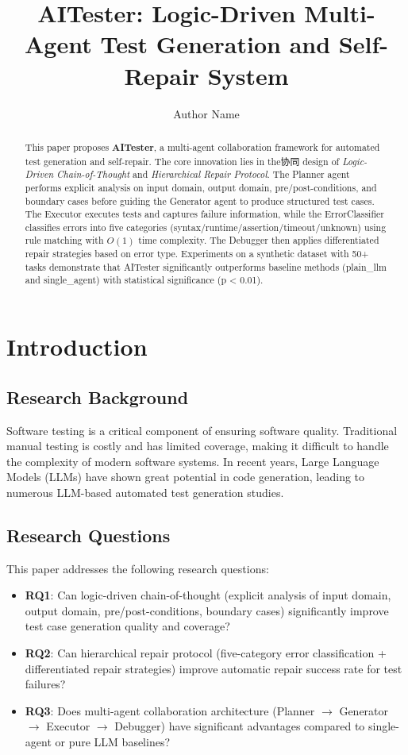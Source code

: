 \documentclass[10pt, conference]{ieeeconf}
\title{\bf AITester: Logic-Driven Multi-Agent Test Generation and Self-Repair System}
\author{Author Name}
\begin{document}
\maketitle

\begin{abstract}
This paper proposes \textbf{AITester}, a multi-agent collaboration framework for automated test generation and self-repair. The core innovation lies in the协同 design of \textit{Logic-Driven Chain-of-Thought} and \textit{Hierarchical Repair Protocol}. The Planner agent performs explicit analysis on input domain, output domain, pre/post-conditions, and boundary cases before guiding the Generator agent to produce structured test cases. The Executor executes tests and captures failure information, while the ErrorClassifier classifies errors into five categories (syntax/runtime/assertion/timeout/unknown) using rule matching with $O(1)$ time complexity. The Debugger then applies differentiated repair strategies based on error type. Experiments on a synthetic dataset with 50+ tasks demonstrate that AITester significantly outperforms baseline methods (plain\_llm and single\_agent) with statistical significance (p < 0.01).
\end{abstract}

\section{Introduction}

\subsection{Research Background}
Software testing is a critical component of ensuring software quality. Traditional manual testing is costly and has limited coverage, making it difficult to handle the complexity of modern software systems. In recent years, Large Language Models (LLMs) have shown great potential in code generation, leading to numerous LLM-based automated test generation studies.

\subsection{Research Questions}
This paper addresses the following research questions:
\begin{itemize}
    \item \textbf{RQ1}: Can logic-driven chain-of-thought (explicit analysis of input domain, output domain, pre/post-conditions, boundary cases) significantly improve test case generation quality and coverage?
    \item \textbf{RQ2}: Can hierarchical repair protocol (five-category error classification + differentiated repair strategies) improve automatic repair success rate for test failures?
    \item \textbf{RQ3}: Does multi-agent collaboration architecture (Planner $\rightarrow$ Generator $\rightarrow$ Executor $\rightarrow$ Debugger) have significant advantages compared to single-agent or pure LLM baselines?
\end{itemize}
\end{document}
